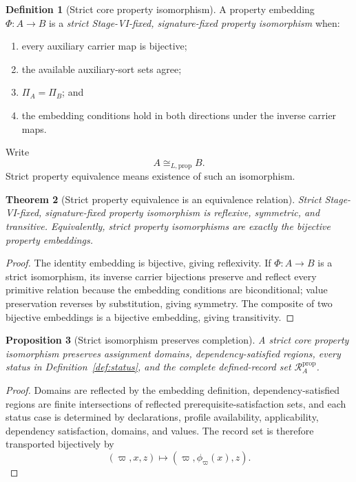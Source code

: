 \documentclass[11pt]{article}
\newcommand{\PropRec}{\mathcal R^{\mathrm{prop}}}
\newtheorem{theorem}{Theorem}[section]
\newtheorem{proposition}[theorem]{Proposition}
\theoremstyle{definition}
\newtheorem{definition}[theorem]{Definition}
\theoremstyle{remark}
\begin{document}
\begin{definition}[Strict core property isomorphism]
\label{def:strict-iso}
A property embedding \(\Phi:A\to B\) is a \emph{strict Stage-VI-fixed, signature-fixed property isomorphism} when:
\begin{enumerate}[label=(S\arabic*)]
\item every auxiliary carrier map is bijective;
\item the available auxiliary-sort sets agree;
\item \(\Pi_A=\Pi_B\); and
\item the embedding conditions hold in both directions under the inverse carrier maps.
\end{enumerate}
Write
\[
A\cong_{L,\mathrm{prop}} B.
\]
Strict property equivalence means existence of such an isomorphism.
\end{definition}

\begin{theorem}[Strict property equivalence is an equivalence relation]
\label{thm:strict-equivalence}
Strict Stage-VI-fixed, signature-fixed property isomorphism is reflexive, symmetric, and transitive.
Equivalently, strict property isomorphisms are exactly the bijective property embeddings.
\end{theorem}

\begin{proof}
The identity embedding is bijective, giving reflexivity.
If \(\Phi:A\to B\) is a strict isomorphism, its inverse carrier bijections preserve and reflect every primitive relation because the embedding conditions are biconditional; value preservation reverses by substitution, giving symmetry.
The composite of two bijective embeddings is a bijective embedding, giving transitivity.
\end{proof}

\begin{proposition}[Strict isomorphism preserves completion]
A strict core property isomorphism preserves assignment domains, dependency-satisfied regions, every status in Definition~\ref{def:status}, and the complete defined-record set \(\PropRec_A\).
\end{proposition}

\begin{proof}
Domains are reflected by the embedding definition, dependency-satisfied regions are finite intersections of reflected prerequisite-satisfaction sets, and each status case is determined by declarations, profile availability, applicability, dependency satisfaction, domains, and values.
The record set is therefore transported bijectively by
\[
(\varpi,x,z)\longmapsto(\varpi,\phi_{\varpi}(x),z).
\]
\end{proof}
\end{document}
